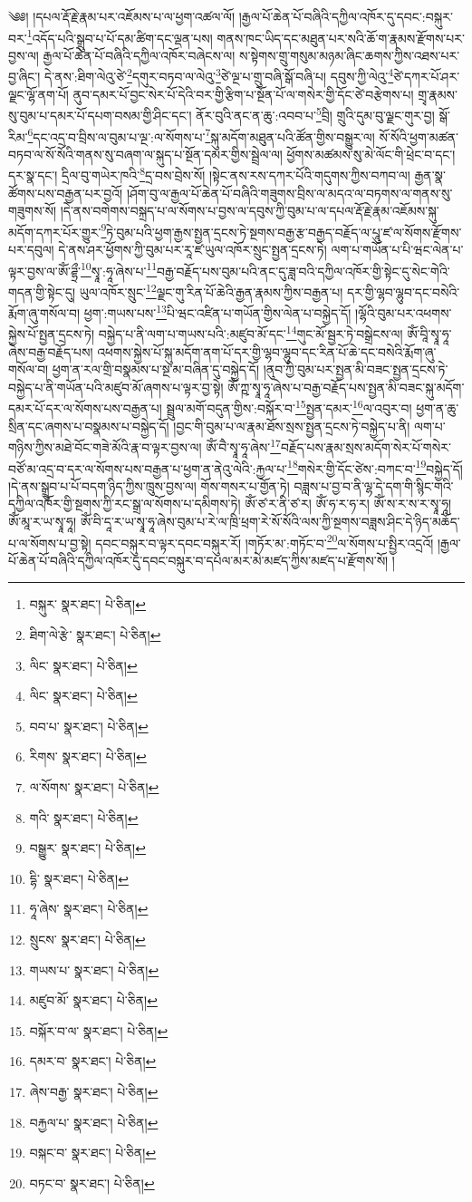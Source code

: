 \setcounter{footnote}{0} 
༄༅། །དཔལ་རྡོ་རྗེ་རྣམ་པར་འཇོམས་པ་ལ་ཕྱག་འཚལ་ལོ། །རྒྱལ་པོ་ཆེན་པོ་བཞིའི་དཀྱིལ་འཁོར་དུ་དབང་:བསྐུར་བར་\footnote{བསྐུར་  སྣར་ཐང་།  པེ་ཅིན། }འདོད་པའི་སྒྲུབ་པ་པོ་དམ་ཚིག་དང་ལྡན་པས། གནས་ཁང་ཡིད་དང་མཐུན་པར་སའི་ཆོ་ག་རྣམས་རྫོགས་པར་བྱས་ལ། རྒྱལ་པོ་ཆེན་པོ་བཞིའི་དཀྱིལ་འཁོར་བཞེངས་ལ། ས་སྟེགས་གྲུ་གསུམ་མཉམ་ཞིང་ཆགས་ཀྱིས་འཐས་པར་བྱ་ཞིང་། དེ་ནས་:ཐིག་ལེའུ་ཙེ་\footnote{ཐིག་ལེ་རྩེ་  སྣར་ཐང་།  པེ་ཅིན། }དགུར་བཏབ་ལ་ལེའུ་\footnote{ལིང་  སྣར་ཐང་།  པེ་ཅིན། }ཙེ་ལྔ་པ་གྲུ་བཞི་སྒོ་བཞི་པ། དབུས་ཀྱི་ལེའུ་\footnote{ལིང་  སྣར་ཐང་།  པེ་ཅིན། }ཙེ་དཀར་པོ་ཤར་ལྗང་ལྷོ་ནག་པོ། ནུབ་དམར་པོ་བྱང་སེར་པོ་དེའི་བར་གྱི་རྩིག་པ་སྔོན་པོ་ལ་གསེར་གྱི་དོང་ཙེ་བརྩེགས་པ། གྲྭ་རྣམས་སུ་བུམ་པ་དམར་པོ་དཔག་བསམ་གྱི་ཤིང་དང་། ནོར་བུའི་ནང་ན་ཆུ་:འབབ་པ་\footnote{བབ་པ་  སྣར་ཐང་།  པེ་ཅིན། }བྲི། གྲུའི་དུམ་བུ་ལྗང་གུར་བྱ། སྒོ་རིམ་\footnote{རིགས་  སྣར་ཐང་།  པེ་ཅིན། }དང་འདྲ་བ་བྲིས་ལ་བུམ་པ་ལྔ་:ལ་སོགས་པ་\footnote{ལ་སོགས་  སྣར་ཐང་།  པེ་ཅིན། }སྐུ་མདོག་མཐུན་པའི་ཚོན་གྱིས་བསྒྱུར་ལ། སོ་སོའི་ཕྱག་མཚན་བཏབ་ལ་སོ་སོའི་གནས་སུ་བཞག་ལ་སྐུད་པ་སྔོན་དམར་གྱིས་སྦྲེལ་ལ། ཕྱོགས་མཚམས་སུ་མེ་ལོང་གི་ཕྲེང་བ་དང་། དར་སྣ་དང་། དྲིལ་བུ་གཡེར་ཁའི་\footnote{གའི་  སྣར་ཐང་།  པེ་ཅིན། }དྲ་བས་བྲེས་སོ། །སྟེང་ནས་རས་དཀར་པོའི་གདུགས་ཀྱིས་བཀབ་ལ། རྒྱན་སྣ་ཚོགས་པས་བརྒྱན་པར་བྱའོ། །ཤོག་བུ་ལ་རྒྱལ་པོ་ཆེན་པོ་བཞིའི་གཟུགས་བྲིས་ལ་མདའ་ལ་བཏགས་ལ་གནས་སུ་གཟུགས་སོ། །དེ་ནས་བགེགས་བསྐྲད་པ་ལ་སོགས་པ་བྱས་ལ་དབུས་ཀྱི་བུམ་པ་ལ་དཔལ་རྡོ་རྗེ་རྣམ་འཇོམས་སྐུ་མདོག་དཀར་པོར་གྱུར་\footnote{བསྒྱུར་  སྣར་ཐང་།  པེ་ཅིན། }ཏེ་བུམ་པའི་ཕྱག་རྒྱས་སྤྱན་དྲངས་ཏེ་སྔགས་བརྒྱ་རྩ་བརྒྱད་བརྗོད་ལ་པཱུ་ཛ་ལ་སོགས་རྫོགས་པར་དབུལ། དེ་ནས་ཤར་ཕྱོགས་ཀྱི་བུམ་པར་རཱ་ཛ་ཡུལ་འཁོར་སྲུང་སྤྱན་དྲངས་ཏེ། ལག་པ་གཡོན་པ་པི་ཝང་ལེན་པ་ལྟར་བྱས་ལ་ཨོཾ་ཌྷྲྀ་\footnote{དྷི་  སྣར་ཐང་།  པེ་ཅིན། }སྭཱ་:ཧཱ་ཞེས་པ་\footnote{ཧཱ་ཞེས་  སྣར་ཐང་།  པེ་ཅིན། }བརྒྱ་བརྗོད་པས་བུམ་པའི་ནང་དུ་ཟླ་བའི་དཀྱིལ་འཁོར་གྱི་སྟེང་དུ་སེང་གེའི་གདན་གྱི་སྟེང་དུ། ཡུལ་འཁོར་སྲུང་\footnote{སྲུངས་  སྣར་ཐང་།  པེ་ཅིན། }ལྗང་གུ་རིན་པོ་ཆེའི་རྒྱན་རྣམས་ཀྱིས་བརྒྱན་པ། དར་གྱི་ལྷབ་ལྷུབ་དང་བསེའི་རྨོག་ཞུ་གསོལ་བ། ཕྱག་:གཡས་པས་\footnote{གཡས་པ་  སྣར་ཐང་།  པེ་ཅིན། }པི་ཝང་འཛིན་པ་གཡོན་གྱིས་ལེན་པ་བསྐྱེད་དོ། །ལྷོའི་བུམ་པར་འཕགས་སྐྱེས་པོ་སྤྱན་དྲངས་ཏེ། བསྐྱེད་པ་ནི་ལག་པ་གཡས་པའི་:མཛུབ་མོ་དང་\footnote{མཛུབ་མོ་  སྣར་ཐང་།  པེ་ཅིན། }གུང་མོ་སྦྱར་ཏེ་བསྒྲེངས་ལ། ཨོཾ་བཱི་སྭཱ་ཧཱ་ཞེས་བརྒྱ་བརྗོད་པས། འཕགས་སྐྱེས་པོ་སྐུ་མདོག་ནག་པོ་དར་གྱི་ལྷབ་ལྷུབ་དང་རིན་པོ་ཆེ་དང་བསེའི་རྨོག་ཞུ་གསོལ་བ། ཕྱག་ན་རལ་གྲི་བསྣམས་པ་སྔ་མ་བཞིན་དུ་བསྐྱེད་དོ། །ནུབ་ཀྱི་བུམ་པར་སྤྱན་མི་བཟང་སྤྱན་དྲངས་ཏེ་བསྐྱེད་པ་ནི་གཡོན་པའི་མཛུབ་མོ་ཞགས་པ་ལྟར་བྱ་སྟེ། ཨོཾ་ཀྵ་སྭཱ་ཧཱ་ཞེས་པ་བརྒྱ་བརྗོད་པས་སྤྱན་མི་བཟང་སྐུ་མདོག་དམར་པོ་དར་ལ་སོགས་པས་བརྒྱན་པ། སྦྲུལ་མགོ་བདུན་གྱིས་:བསྐོར་བ་\footnote{བསྐོར་བ་ལ་  སྣར་ཐང་།  པེ་ཅིན། }སྤྱན་དམར་\footnote{དམར་བ་  སྣར་ཐང་།  པེ་ཅིན། }ལ་འབུར་བ། ཕྱག་ན་ཆུ་སྲིན་དང་ཞགས་པ་བསྣམས་པ་བསྐྱེད་དོ། །བྱང་གི་བུམ་པ་ལ་རྣམ་ཐོས་སྲས་སྤྱན་དྲངས་ཏེ་བསྐྱེད་པ་ནི། ལག་པ་གཉིས་ཀྱིས་མཐེ་བོང་གཟེ་མོའི་རྣ་བ་ལྟར་བྱས་ལ། ཨོཾ་བཻ་སྭཱ་ཧཱ་ཞེས་\footnote{ཞེས་བརྒྱ་  སྣར་ཐང་།  པེ་ཅིན། }བརྗོད་པས་རྣམ་སྲས་མདོག་སེར་པོ་གསེར་བཙོ་མ་འདྲ་བ་དར་ལ་སོགས་པས་བརྒྱན་པ་ཕྱག་ན་ནེའུ་ལེའི་:རྐྱལ་པ་\footnote{བརྐྱལ་པ་  སྣར་ཐང་།  པེ་ཅིན། }གསེར་གྱི་དོང་ཙེས་:བཀང་བ་\footnote{བསྐང་བ་  སྣར་ཐང་།  པེ་ཅིན། }བསྐྱེད་དོ། །དེ་ནས་སྒྲུབ་པ་པོ་བདག་ཉིད་ཀྱིས་ཁྲུས་བྱས་ལ། གོས་གསར་པ་གྱོན་ཏེ། བཟླས་པ་བྱ་བ་ནི་ལྷ་དེ་དག་གི་སྙིང་གའི་དཀྱིལ་འཁོར་གྱི་སྔགས་ཀྱི་རང་སྒྲ་ལ་སོགས་པ་དམིགས་ཏེ། ཨོཾ་ཙ་ར་ནི་ཙ་ར། ཨོཾ་ཧ་ར་ཧ་ར། ཨོཾ་ས་ར་ས་ར་སྭཱ་ཧཱ། ཨོཾ་མཱ་ར་ཡ་སྭཱ་ཧཱ། ཨོཾ་བི་དཱ་ར་ཡ་སྭཱ་ཧཱ་ཞེས་བུམ་པ་རེ་ལ་ཁྲི་ཕྲག་རེ་སོ་སོའི་ལས་ཀྱི་སྔགས་བཟླས་ཤིང་དེ་ཉིད་མཆོད་པ་ལ་སོགས་པ་བྱ་སྟེ། དབང་བསྐུར་བ་ལྟར་དབང་བསྐུར་རོ། །གཏོར་མ་:གཏོང་བ་\footnote{བཏང་བ་  སྣར་ཐང་།  པེ་ཅིན། }ལ་སོགས་པ་སྤྱིར་འདྲའོ། །རྒྱལ་པོ་ཆེན་པོ་བཞིའི་དཀྱིལ་འཁོར་དུ་དབང་བསྐུར་བ་དཔལ་མར་མེ་མཛད་ཀྱིས་མཛད་པ་རྫོགས་སོ། ། 